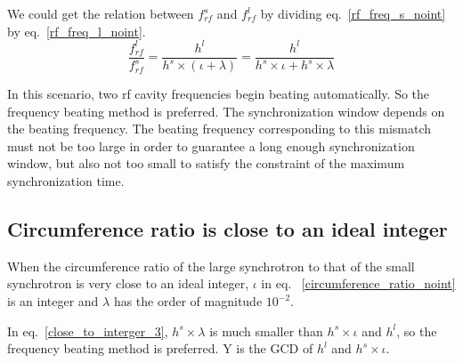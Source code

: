 We could get the relation between $f_{rf}^{s}$ and $f_{rf}^{l}$ by dividing eq.~\ref{rf_freq_s_noint} by eq.~\ref{rf_freq_l_noint}.
\begin{equation} 
\frac{f_{rf}^{l}}{f_{rf}^{s}}=\frac{h^l}{h^s \times (\iota+ \lambda)}=\frac{h^l}{h^s \times \iota+ h^s \times \lambda}\label{close_to_interger_3}
\end{equation}

In this scenario, two rf cavity frequencies begin beating automatically. So the frequency beating method is preferred. The synchronization window depends on the beating frequency. The beating frequency corresponding to this mismatch must not be too large in order to guarantee a long enough synchronization window, but also not too small to satisfy the constraint of the maximum synchronization time.
\subsection{Circumference ratio is close to an ideal integer}
When the circumference ratio of the large synchrotron to that of the small synchrotron is very close to an ideal integer, $\iota$ in eq. ~\ref{circumference_ratio_noint} is an integer and $\lambda$ has the order of magnitude $10^{-2}$.


In eq.~\ref{close_to_interger_3}, $h^s\times\lambda $ is much smaller than $h^s \times \iota$ and $h^l$, so the frequency beating method is preferred. Y is the GCD of $h^l$ and $h^s \times \iota$.



